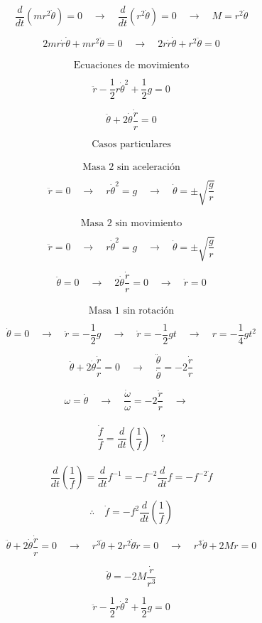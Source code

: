 \documentclass[10pt,a4papper]{article}
\begin{document}
\[\frac{d}{dt}(mr^2\dot\theta)=0\quad\to\quad\frac{d}{dt}(r^2\dot\theta)=0\quad\to\quad M=r^2\dot\theta\]

\[2mr\dot r\dot\theta+mr^2\ddot\theta=0\quad\to\quad 2r\dot r\dot\theta+r^2\ddot\theta=0\]\\

\[\text{Ecuaciones de movimiento}\]

\[\ddot r-\frac{1}{2}r\dot\theta^2+\frac{1}{2}g=0\]

\[\ddot\theta+2\dot\theta\frac{\dot r}{r}=0\]

\newpage
\[\text{Casos particulares}\]\\

\[\text{Masa 2 sin aceleración}\]

\[\ddot r=0\quad\to\quad r\dot\theta^2=g\quad\to\quad\dot\theta=\pm\sqrt{\frac{g}{r}}\]\\

\[\text{Masa 2 sin movimiento}\]

\[\ddot r=0\quad\to\quad r\dot\theta^2=g\quad\to\quad\dot\theta=\pm\sqrt{\frac{g}{r}}\]

\[\ddot\theta=0\quad\to\quad 2\dot\theta\frac{\dot r}{r}=0\quad\to\quad\dot r=0\]\\

\[\text{Masa 1 sin rotación}\]

\[\dot\theta=0\quad\to\quad\ddot r=-\frac{1}{2}g\quad\to\quad\dot r=-\frac{1}{2}gt\quad\to\quad r=-\frac{1}{4}gt^2\]

\newpage
\[\ddot\theta+2\dot\theta\frac{\dot r}{r}=0\quad\to\quad\frac{\ddot\theta}{\dot\theta}=-2\frac{\dot r}{r}\]

\[\omega=\dot\theta\quad\to\quad
\frac{\dot\omega}{\omega}=-2\frac{\dot r}{r}\quad\to\quad\]\\

\[\frac{\dot f}{f}=\frac{d}{dt}\left(\frac{1}{f}\right)\quad ?\]\\

\[\frac{d}{dt}\left(\frac{1}{f}\right)=\frac{d}{dt}f^{-1}=-f^{-2}\frac{d}{dt}f=-f^{-2}\dot f\]

\[\therefore\quad\dot f=-f^2\frac{d}{dt}\left(\frac{1}{f}\right)\]

\newpage
\[\ddot\theta+2\dot\theta\frac{\dot r}{r}=0\quad\to\quad r^3\ddot\theta+2r^2\dot\theta\dot r=0\quad\to\quad r^3\ddot\theta+2M\dot r=0\]

\[\ddot\theta=-2M\frac{\dot r}{r^3}\]

\newpage
\[\ddot r-\frac{1}{2}r\dot\theta^2+\frac{1}{2}g=0\]
\end{document}
